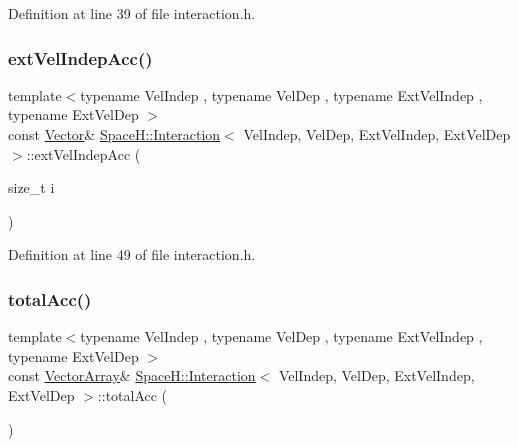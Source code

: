 Definition at line 39 of file interaction.\+h.

\mbox{\label{class_space_h_1_1_interaction_aac3afcba9593992baf9311b50265eb6d}} 
\subsubsection{\texorpdfstring{ext\+Vel\+Indep\+Acc()}{extVelIndepAcc()}\hspace{0.1cm}{\footnotesize\ttfamily [2/2]}}
{\footnotesize\ttfamily template$<$typename Vel\+Indep , typename Vel\+Dep , typename Ext\+Vel\+Indep , typename Ext\+Vel\+Dep $>$ \\
const \mbox{\hyperlink{class_space_h_1_1_interaction_ad6d656d30b9272a5f690b0412a4a9a86}{Vector}}\& \mbox{\hyperlink{class_space_h_1_1_interaction}{Space\+H\+::\+Interaction}}$<$ Vel\+Indep, Vel\+Dep, Ext\+Vel\+Indep, Ext\+Vel\+Dep $>$\+::ext\+Vel\+Indep\+Acc (\begin{DoxyParamCaption}\item[{size\+\_\+t}]{i }\end{DoxyParamCaption})\hspace{0.3cm}{\ttfamily [inline]}}



Definition at line 49 of file interaction.\+h.

\mbox{\label{class_space_h_1_1_interaction_ae798bbb6d97bc4ff9af4d59a117b2b40}} 
\subsubsection{\texorpdfstring{total\+Acc()}{totalAcc()}\hspace{0.1cm}{\footnotesize\ttfamily [1/2]}}
{\footnotesize\ttfamily template$<$typename Vel\+Indep , typename Vel\+Dep , typename Ext\+Vel\+Indep , typename Ext\+Vel\+Dep $>$ \\
const \mbox{\hyperlink{class_space_h_1_1_interaction_a9aaccf9a34d875881d9448acf7aaf009}{Vector\+Array}}\& \mbox{\hyperlink{class_space_h_1_1_interaction}{Space\+H\+::\+Interaction}}$<$ Vel\+Indep, Vel\+Dep, Ext\+Vel\+Indep, Ext\+Vel\+Dep $>$\+::total\+Acc (\begin{DoxyParamCaption}{ }\end{DoxyParamCaption})\hspace{0.3cm}{\ttfamily [inline]}}



